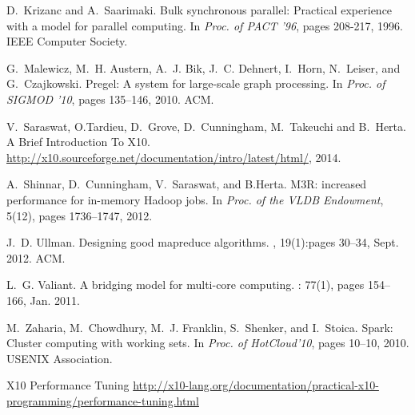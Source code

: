 \documentclass[a4paper]{article}
\numberwithin{equation}{section}
\begin{document}
\begin{thebibliography}{10}
D.~Krizanc and A.~Saarimaki.
\newblock Bulk synchronous parallel: Practical experience with a model for parallel computing.
\newblock In {\em Proc. of PACT '96}, pages 208-217, 1996. IEEE Computer Society.

G.~Malewicz, M.~H. Austern, A.~J. Bik, J.~C. Dehnert, I.~Horn, N.~Leiser, and
  G.~Czajkowski.
\newblock Pregel: A system for large-scale graph processing.
\newblock In {\em Proc. of SIGMOD '10}, pages 135--146, 2010. ACM.




V.~Saraswat, O.Tardieu, D.~Grove, D.~Cunningham, M.~Takeuchi and B.~Herta.
\newblock A Brief Introduction To X10.
\newblock
\url{http://x10.sourceforge.net/documentation/intro/latest/html/}, 2014.

A.~Shinnar, D.~Cunningham, V.~Saraswat, and B.Herta. 
\newblock M3R: increased performance for in-memory Hadoop jobs.
\newblock In {\em Proc. of the VLDB Endowment}, 5(12), pages
1736--1747, 2012.

J.~D. Ullman.
\newblock Designing good mapreduce algorithms.
, 19(1):pages 30--34, Sept. 2012. ACM.

L.~G. Valiant.
\newblock A bridging model for multi-core computing.
: 77(1), pages
154--166, Jan. 2011.

M.~Zaharia, M.~Chowdhury, M.~J. Franklin, S.~Shenker, and I.~Stoica.
\newblock Spark: Cluster computing with working sets.
\newblock In {\em Proc. of HotCloud'10}, pages 10--10, 2010. USENIX Association.


X10 Performance Tuning
\url{http://x10-lang.org/documentation/practical-x10-programming/performance-tuning.html}










\end{thebibliography}
\end{document}
